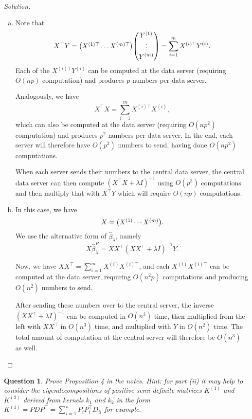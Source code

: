 \documentclass{article}
\theoremstyle{plain}
\newtheorem{question}{Question}
\theoremstyle{remark}
\newenvironment{solution}{\begin{proof}[Solution]\renewcommand\qedsymbol{}}{\end{proof}}
\newcommand{\T}{^\top} %
\begin{document}
\begin{solution}
    \begin{enumerate}[(a)]
        \item Note that
        \[
        X\T Y = \mqty( X^{(1)\top} \dotsc X^{(m)\top}) \mqty( Y^{(1)}\\\vdots\\Y^{(m)}) = \sum_{i=1}^m X^{(i)\top} Y^{(i)}. 
        \]
        Each of the $X^{(i)\top} Y^{(i)}$ can be computed at the data server (requiring $O(np)$ computation) and produces $p$ numbers per data server. 
        
        Analogously, we have
        \[
        X\T X = \sum_{i=1}^m X^{(i)\top} X^{(i)},
        \]
        which can also be computed at the data server (requiring $O(np^2)$ computation) and produces $p^2$ numbers per data server. In the end, each server will therefore have $O(p^2)$ numbers to send, having done $O(np^2)$ computations. 
        
        When each server sends their numbers to the central data server, the central data server can then compute $(X\T X + \lambda I)^{-1}$ using $O(p^3)$ computations and then multiply that with $X\T Y$ which will require $O(np)$ computations. 
        
        \item In this case, we have 
        \[
        X = \mqty( X^{(1)} \dotsb X^{(m)} ). 
        \]
        We use the alternative form of  $\hat\beta_\lambda$, namely
        \[
        X \hat\beta_\lambda^R = XX\T (XX\T + \lambda I)^{-1} Y.
        \]
        
        Now, we have $XX\T = \sum_{i=1}^m X^{(i)} X^{(i)\top}$, and each $X^{(i)} X^{(i)\top}$ can be computed at the data server, requiring $O(n^2 p)$ computations and producing $O(n^2)$ numbers to send.  
        
        After sending these numbers over to the central server, the inverse $(XX\T + \lambda I)^{-1}$ can be computed in $O(n^3)$ time, then multiplied from the left with $XX\T$ in $O(n^3)$ time, and multiplied with $Y$ in $O(n^2)$ time. The total amount of computation at the central server will therefore be $O(n^3)$ as well. 
    \end{enumerate}
\end{solution}

\begin{question}
	Prove Proposition 4 in the notes. \emph{Hint: for part (ii) it may help to consider the eigendecompositions of positive semi-definite matrices $K^{(1)}$ and $K^{(2)}$ derived from kernels $k_1$ and $k_2$ in the form $K^{(1)} = PDP\T = \sum_{i=1}^n P_iP_i\T D_{ii}$ for example. }
\end{question}
\end{document}
